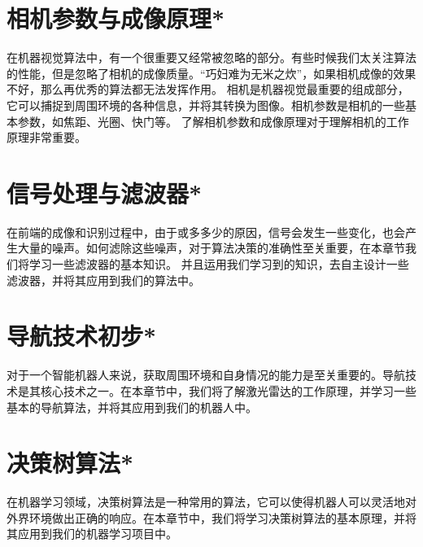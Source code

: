 \documentclass[withoutpreface,bwprint]{cumcmthesis} %
\begin{document}
\section{相机参数与成像原理*} 

在机器视觉算法中，有一个很重要又经常被忽略的部分。有些时候我们太关注算法的性能，但是忽略了相机的成像质量。“巧妇难为无米之炊”，如果相机成像的效果不好，那么再优秀的算法都无法发挥作用。
相机是机器视觉最重要的组成部分，它可以捕捉到周围环境的各种信息，并将其转换为图像。相机参数是相机的一些基本参数，如焦距、光圈、快门等。
了解相机参数和成像原理对于理解相机的工作原理非常重要。



\section{信号处理与滤波器*}
在前端的成像和识别过程中，由于或多多少的原因，信号会发生一些变化，也会产生大量的噪声。如何滤除这些噪声，对于算法决策的准确性至关重要，在本章节我们将学习一些滤波器的基本知识。
并且运用我们学习到的知识，去自主设计一些滤波器，并将其应用到我们的算法中。

\section{导航技术初步*}
对于一个智能机器人来说，获取周围环境和自身情况的能力是至关重要的。导航技术是其核心技术之一。在本章节中，我们将了解激光雷达的工作原理，并学习一些基本的导航算法，并将其应用到我们的机器人中。



\section{\quad 决策树算法*}
在机器学习领域，决策树算法是一种常用的算法，它可以使得机器人可以灵活地对外界环境做出正确的响应。在本章节中，我们将学习决策树算法的基本原理，并将其应用到我们的机器学习项目中。

\end{document}
